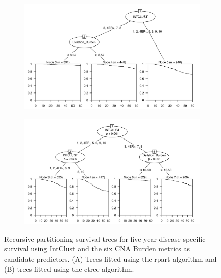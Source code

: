 \begin{figure}[!h]
\centering

\vspace{0.5cm}

\begin{subfigure}{\textwidth}
\subcaption{}
\includegraphics[width=1\textwidth]{../figures/Chapter_3/PartyKit_Survival_Burden_FiveYearDSS_INTCLUST.png}
\end{subfigure}

\vspace{2cm}

\begin{subfigure}{\textwidth}
\subcaption{}
\includegraphics[width=1\textwidth]{../figures/Chapter_3/Ctree_Survival_Burden_FiveYearDSS_INTCLUST.png}
\end{subfigure}

\vspace{0.5cm}

\caption[Recursive partitioning survival trees for five-year disease-specific survival using IntClust and the six CNA Burden metrics as candidate predictors.]{Recursive partitioning survival trees for five-year disease-specific survival using IntClust and the six CNA Burden metrics as candidate predictors. (A) Trees fitted using the rpart algorithm and (B) trees fitted using the ctree algorithm.}
\label{fig:INTCLUST_CNA_Burden_FiveYearDSS}
\end{figure}

